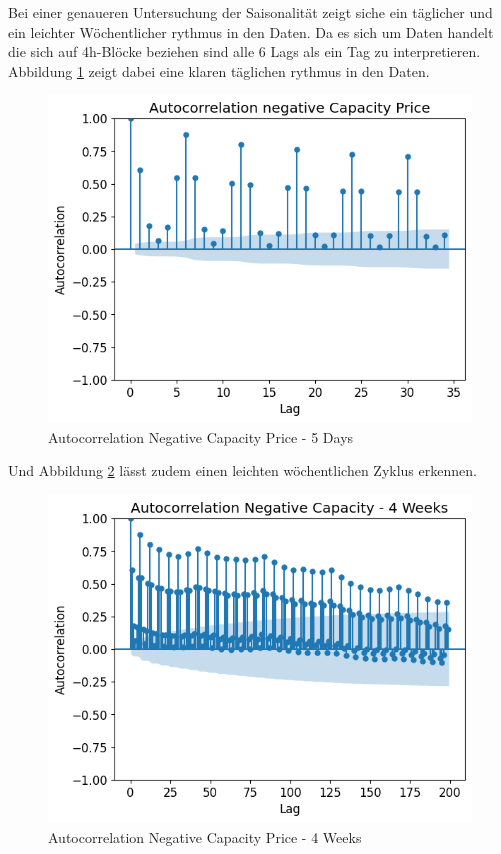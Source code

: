 Bei einer genaueren Untersuchung der Saisonalität zeigt siche ein täglicher und ein leichter Wöchentlicher rythmus in den Daten.
Da es sich um Daten handelt die sich auf 4h-Blöcke beziehen sind alle 6 Lags als ein Tag zu interpretieren.
Abbildung \ref{fig:Autocorrelation Negative Capacity Price - 5 Days} zeigt dabei eine klaren täglichen rythmus in den Daten.

\begin{figure}[!h]
	\includegraphics[width=1\linewidth]{pictures/Autocorrelation negative Capacity Price.png}
	\caption{Autocorrelation Negative Capacity Price - 5 Days}
	\label{fig:Autocorrelation Negative Capacity Price - 5 Days}
\end{figure}

Und Abbildung \ref{fig:AutocorrNegCap4Weeks} lässt zudem einen leichten wöchentlichen Zyklus erkennen.
\begin{figure}[!h]
	\includegraphics[width=1\linewidth]{pictures/Autocorrelation Negative Capacity - 4 Weeks.png}
	\caption{Autocorrelation Negative Capacity Price - 4 Weeks}
	\label{fig:AutocorrNegCap4Weeks}
\end{figure}

